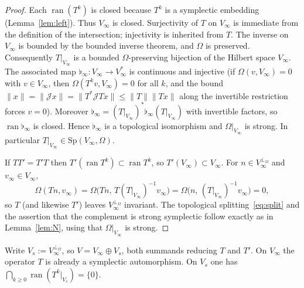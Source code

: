 \documentclass[11pt,a4paper]{article}
\theoremstyle{definition}
\newcommand{\cJ}{\mathcal{J}}
\begin{document}
\begin{proof}
Each \(\operatorname{ran}(T^k)\) is closed because \(T^k\) is a symplectic embedding
(Lemma~\ref{lem:left}). Thus \(V_\infty\) is closed. Surjectivity of \(T\) on \(V_\infty\) is
immediate from the definition of the intersection; injectivity is inherited from \(T\). The
inverse on \(V_\infty\) is bounded by the bounded inverse theorem, and \(\Omega\) is preserved.
Consequently \(T|_{V_\infty}\) is a bounded \(\Omega\)-preserving bijection of the Hilbert space
\(V_\infty\). The associated map \(\flat_\infty:V_\infty\to V_\infty^*\) is continuous and injective
(if \(\Omega(v,V_\infty)=0\) with \(v\in V_\infty\), then \(\Omega(T^kv,V_\infty)=0\) for all \(k\), and
the bound \(\|x\|=\|\cJ x\|=\|T^*\cJ Tx\|\le\|T\|\|Tx\|\) along the invertible restriction forces
\(v=0\)). Moreover \(\flat_\infty=(T|_{V_\infty})^*\flat_\infty(T|_{V_\infty})\) with invertible
factors, so \(\operatorname{ran}\flat_\infty\) is closed. Hence \(\flat_\infty\) is a topological
isomorphism and \(\Omega|_{V_\infty}\) is strong. In particular
\(T|_{V_\infty}\in\mathrm{Sp}(V_\infty,\Omega)\).

If \(TT'=T'T\) then \(T'(\operatorname{ran}T^k)\subset\operatorname{ran}T^k\), so
\(T'(V_\infty)\subset V_\infty\). For \(n\in V_\infty^{\perp_\Omega}\) and \(v_\infty\in V_\infty\),
\[
\Omega(Tn,v_\infty)=\Omega\bigl(Tn,\,T(T|_{V_\infty})^{-1}v_\infty\bigr)
=\Omega\bigl(n,\,(T|_{V_\infty})^{-1}v_\infty\bigr)=0,
\]
so \(T\) (and likewise \(T'\)) leaves \(V_\infty^{\perp_\Omega}\) invariant. The topological
splitting~\eqref{eq:split} and the assertion that the complement is strong symplectic follow
exactly as in Lemma~\ref{lem:N}, using that \(\Omega|_{V_\infty}\) is strong.
\end{proof}

Write \(V_s:=V_\infty^{\perp_\Omega}\), so \(V=V_\infty\oplus V_s\), both summands reducing \(T\) and
\(T'\). On \(V_\infty\) the operator \(T\) is already a symplectic automorphism. On \(V_s\) one has
\(\bigcap_{k\ge 0}\operatorname{ran}(T^k|_{V_s})=\{0\}\).
\end{document}
